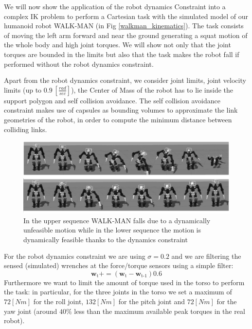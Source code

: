 We will now show the application of the robot dynamics Constraint into a complex IK problem to perform a Cartesian task with the simulated model of our humanoid robot WALK-MAN (in Fig \ref{walkman_kinematics}). The task consists of moving the left arm forward and near the ground generating a squat motion of the whole body and high joint torques. We will show not only that the joint torques are bounded in the limits but also that the task makes the robot fall if performed without the robot dynamics constraint. 

Apart from the robot dynamics constraint, we consider joint limits, joint velocity limits (up to $0.9 \ \left[ \frac{rad}{sec} \right]$), the Center of Mass of the robot has to lie inside the support polygon and self collision avoidance. 
The self collision avoidance constraint makes use of capsules as bounding volumes to approximate the link geometries of the robot, in order to compute the minimum distance between colliding links.

\begin{figure}[htb] 
\centering 
\includegraphics[width=\textwidth]{images/dynamic_constr.eps} 
\caption{In the upper sequence WALK-MAN falls due to a dynamically unfeasible motion while in the lower sequence the motion is dynamically feasible thanks to the dynamics constraint} 
\label{gazebo}
\end{figure}

For the robot dynamics constraint we are using $\sigma = 0.2$ and we are filtering the sensed (simulated) wrenches at the force/torque sensors using a simple filter:
\begin{equation}
\mathbf{w}_\text{t} \mathrel{{+}{=}} \left( \mathbf{w}_\text{t} - \mathbf{w}_\text{t-1} \right) 0.6
\end{equation}
Furthermore we want to limit the amount of torque used in the torso to perform the task: in particular, for the three joints in the torso we set a maximum of $72 \left[ Nm\right]$ for the roll joint, $132 \left[ Nm\right]$ for the pitch joint and $72 \left[ Nm\right]$ for the yaw joint (around $40\%$ less than the maximum available peak torques in the real robot). 

